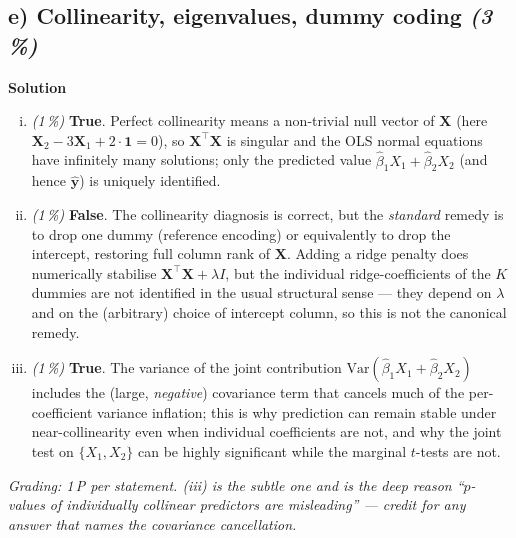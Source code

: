 \documentclass[11pt,a4paper]{article}
\newcommand{\subpoints}[1]{\textit{(#1\,\%)}}
\newcommand{\sol}{\noindent\textbf{Solution}}
\begin{document}
\subsection*{e) Collinearity, eigenvalues, dummy coding \subpoints{3}}
\sol{}
\begin{enumerate}[(i)]
  \item \subpoints{1} \textbf{True}. Perfect collinearity means a non-trivial null vector of
        $\mathbf{X}$ (here $\mathbf{X}_2 - 3\mathbf{X}_1 + 2\cdot\mathbf{1} = 0$), so
        $\mathbf{X}^\top \mathbf{X}$ is singular and the OLS normal equations have infinitely many
        solutions; only the predicted value $\hat\beta_1 X_1 + \hat\beta_2 X_2$ (and hence
        $\hat{\mathbf{y}}$) is uniquely identified.
  \item \subpoints{1} \textbf{False}. The collinearity diagnosis is correct, but the
        \emph{standard} remedy is to drop one dummy (reference encoding) or equivalently to
        drop the intercept, restoring full column rank of $\mathbf{X}$. Adding a ridge
        penalty does numerically stabilise $\mathbf{X}^\top \mathbf{X} + \lambda I$, but
        the individual ridge-coefficients of the $K$ dummies are not identified in the
        usual structural sense --- they depend on $\lambda$ and on the (arbitrary) choice
        of intercept column, so this is not the canonical remedy.
  \item \subpoints{1} \textbf{True}. The variance of the joint contribution
        $\mathrm{Var}(\hat\beta_1 X_1 + \hat\beta_2 X_2)$ includes the (large, \emph{negative})
        covariance term that cancels much of the per-coefficient variance inflation; this is why
        prediction can remain stable under near-collinearity even when individual coefficients are
        not, and why the joint test on $\{X_1, X_2\}$ can be highly significant while the marginal
        $t$-tests are not.
\end{enumerate}
\emph{Grading: 1\,P per statement. (iii) is the subtle one and is the deep reason ``$p$-values
of individually collinear predictors are misleading'' --- credit for any answer that names the
covariance cancellation.}
\end{document}
